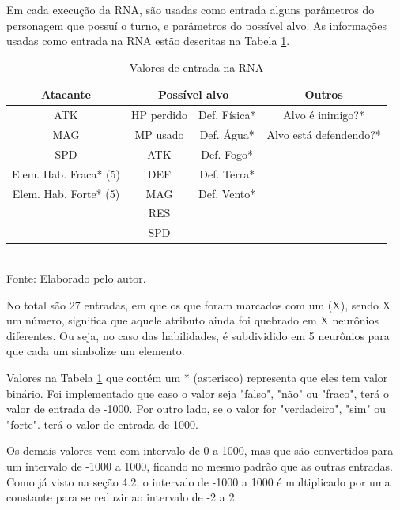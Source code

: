 \documentclass[12pt,a4paper]{article}
\newcommand{\source}[1]{\small Fonte: {#1}}
\begin{document}
	Em cada execução da RNA, são usadas como entrada alguns parâmetros do personagem que possuí o turno,
	e parâmetros do possível alvo.
	As informações usadas como entrada na RNA estão descritas na Tabela \ref{tab:nnInput}.
	
	\begin{table}[h]
		\caption{Valores de entrada na RNA}
		\centering
		\small
		\renewcommand{\arraystretch}{1.2} %
		\begin{tabular}{c|c|c|c}
			\hline 
			\textbf{Atacante}			& \multicolumn{2}{c|}{\textbf{Possível alvo}}	& \textbf{Outros}		\\\hline
			ATK							& HP perdido		& Def. Física*		& Alvo é inimigo?*				\\ 
			MAG							& MP usado			& Def. Água*		& Alvo está defendendo?*		\\ 
			SPD							& ATK				& Def. Fogo*		& 								\\ 
			Elem. Hab. Fraca* (5)		& DEF				& Def. Terra*		& 								\\ 
			Elem. Hab. Forte* (5)		& MAG				& Def. Vento*		& 								\\ 
										& RES									& 								\\
										& SPD									& 								\\\hline
		\end{tabular}\\
		\vspace{3mm}
		\source{Elaborado pelo autor.}
		\label{tab:nnInput}
	\end{table}
	
	No total são 27 entradas,
	em que os que foram marcados com um (X), sendo X um número,
	significa que aquele atributo ainda foi quebrado em X neurônios diferentes.
	Ou seja, no caso das habilidades,
	é subdividido em 5 neurônios para que cada um simbolize um elemento.
	
	Valores na Tabela \ref{tab:nnInput} que contém um * (asterisco) representa que eles tem valor binário.
	Foi implementado que caso o valor seja "falso"{}, "não"{} ou "fraco"{}, terá o valor de entrada de -1000.
	Por outro lado, se o valor for "verdadeiro"{}, "sim"{} ou "forte"{}. terá o valor de entrada de 1000.
	
	Os demais valores vem com intervalo de 0 a 1000,
	mas que são convertidos para um intervalo de -1000 a 1000,
	ficando no mesmo padrão que as outras entradas.
	Como já visto na seção 4.2,
	o intervalo de -1000 a 1000 é multiplicado por uma constante para se reduzir ao intervalo de -2 a 2.
	
\end{document}
